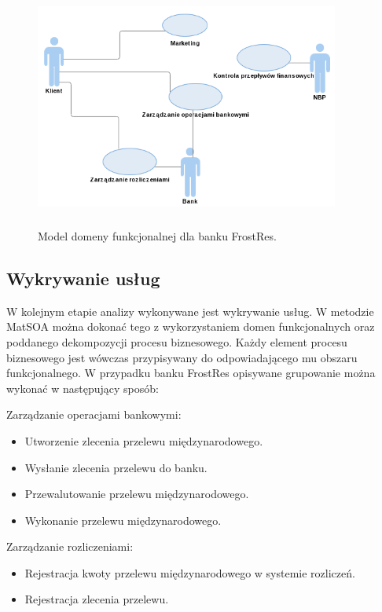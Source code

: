 \begin{figure}[h!tbp]
\begin{centering}
\includegraphics[width=10cm, height=8cm]{img/bank_fd.png}
\caption[Model domeny funkcjonalnej dla banku FrostRes]{Model domeny funkcjonalnej dla banku FrostRes.}\label{FD_frostres}
\end{centering}
\end{figure}

\subsection{Wykrywanie usług}
W kolejnym etapie analizy wykonywane jest wykrywanie usług. W metodzie MatSOA można dokonać tego z wykorzystaniem domen funkcjonalnych oraz poddanego dekompozycji procesu biznesowego. Każdy element procesu biznesowego jest wówczas przypisywany do odpowiadającego mu obszaru funkcjonalnego. W przypadku banku FrostRes opisywane grupowanie można wykonać w następujący sposób:

Zarządzanie operacjami bankowymi:
\begin{itemize}
\item{Utworzenie zlecenia przelewu międzynarodowego.}
\item{Wysłanie zlecenia przelewu do banku.}
\item{Przewalutowanie przelewu międzynarodowego.}
\item{Wykonanie przelewu międzynarodowego.}
\end{itemize}

Zarządzanie rozliczeniami:
\begin{itemize}
\item{Rejestracja kwoty przelewu międzynarodowego w systemie rozliczeń.}
\item{Rejestracja zlecenia przelewu.}
\end{itemize}

